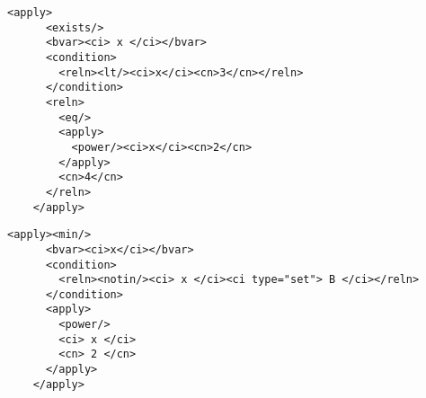 \documentclass{llncs}
\begin{document}
{\begin{lstlisting}[label=ex:exists2,language=MathML2,
  caption={MathML 1 for ``there exists $x < 3$ such that $x^2=4$''}]
    <apply>
      <exists/>
      <bvar><ci> x </ci></bvar>
      <condition>
        <reln><lt/><ci>x</ci><cn>3</cn></reln>
      </condition>
      <reln>
        <eq/>
        <apply>
          <power/><ci>x</ci><cn>2</cn>
        </apply>
        <cn>4</cn>
      </reln>
    </apply>
\end{lstlisting}
\fi
\iffull

\begin{lstlisting}[label=ex:connotin,language=MathML2,
  caption={MathML 1 for ``there exists $x$ such that $x^5 < 3$''}]
    <apply><min/>
      <bvar><ci>x</ci></bvar>
      <condition>
        <reln><notin/><ci> x </ci><ci type="set"> B </ci></reln>
      </condition>
      <apply>
        <power/>
        <ci> x </ci>
        <cn> 2 </cn>
      </apply>
    </apply>
\end{lstlisting}

}
\end{document}
